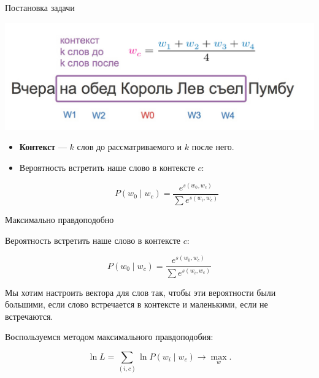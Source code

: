 \documentclass[notes,12pt, aspectratio=169]{beamer}
\newenvironment{wideitemize}{\itemize\addtolength{\itemsep}{10pt}}{\enditemize}
\begin{document}

\begin{frame}{Постановка задачи}
\begin{center}
\includegraphics[width=.7\linewidth]{context_1.jpg}
\end{center}
\begin{itemize} 
\item \textbf{Контекст} — $k$ слов до рассматриваемого и $k$ после него. 


\item Вероятность встретить наше слово в контексте $c$: 

\[
P(w_0 \mid w_c) = \frac{e^{s(w_0, w_c)}}{\sum e^{s(w_i, w_c)}}
\]

\end{itemize} 
\end{frame} 


\begin{frame}{Максимально правдоподобно}
\begin{wideitemize} 
\item Вероятность встретить наше слово в контексте $c$: 

\[
P(w_0 \mid w_c) = \frac{e^{s(w_0, w_c)}}{\sum e^{s(w_i, w_c)}}
\]

\item Мы хотим настроить вектора для слов так, чтобы эти вероятности были большими, если слово встречается в контексте и маленькими, если не встречаются. 

\item Воспользуемся методом максимального правдоподобия: 

\[ 
\ln L = \sum_{(i,c)} \ln P(w_i \mid w_c)  \to \max_{w}.
\]
\end{wideitemize} 
\end{frame} 
\end{document}
